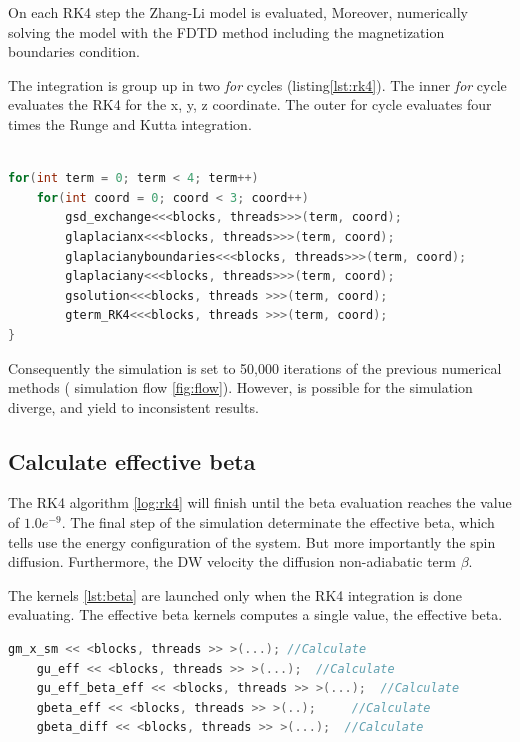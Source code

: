 On each RK4 step the Zhang-Li model is evaluated, Moreover, numerically solving the model with the FDTD method including the magnetization boundaries condition.

The integration is group up in two \textit{for} cycles (listing\ref{lst:rk4}). The inner \textit{for} cycle evaluates the RK4 for the x, y, z coordinate. The outer for cycle evaluates four times the Runge and Kutta integration.

\begin{lstlisting}[language=C++, label={lst:rk4}, caption={Summarize of Runge and Kutta 4th Integration}]	

for(int term = 0; term < 4; term++)
	for(int coord = 0; coord < 3; coord++)
    	gsd_exchange<<<blocks, threads>>>(term, coord);
    	glaplacianx<<<blocks, threads>>>(term, coord);
    	glaplacianyboundaries<<<blocks, threads>>>(term, coord);
    	glaplaciany<<<blocks, threads>>>(term, coord);
    	gsolution<<<blocks, threads >>>(term, coord);
    	gterm_RK4<<<blocks, threads >>>(term, coord);
}
\end{lstlisting}

 Consequently the simulation is set to 50,000 iterations of the previous numerical methods ( simulation flow \ref{fig:flow}). However, is possible for the simulation diverge, and yield to inconsistent results.
 
\subsection{Calculate effective beta}

The RK4 algorithm \ref{log:rk4} will finish until the beta evaluation reaches the value of $1.0e^{-9}$. The final step of the simulation determinate the effective beta, which tells use the energy configuration of the system. But more importantly the spin diffusion. Furthermore, the DW velocity the diffusion non-adiabatic term $\beta$.

The kernels \ref{lst:beta} are launched only when the RK4 integration is done evaluating. The effective beta kernels computes a single value, the effective beta.

\begin{lstlisting}[language=C++, label={lst:beta}, caption={Calculate effective beta}]
    gm_x_sm << <blocks, threads >> >(...); //Calculate
    gu_eff << <blocks, threads >> >(...);  //Calculate 
    gu_eff_beta_eff << <blocks, threads >> >(...); 	//Calculate
    gbeta_eff << <blocks, threads >> >(..); 	//Calculate
    gbeta_diff << <blocks, threads >> >(...);  //Calculate             
\end{lstlisting}


